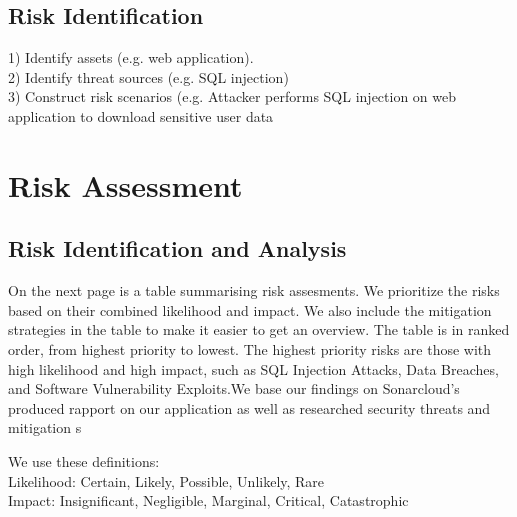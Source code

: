 \documentclass[11pt]{article}
\begin{document}
\subsection{Risk Identification}
1) Identify assets (e.g. web application).\\
2) Identify threat sources (e.g. SQL injection) \\
3) Construct risk scenarios (e.g. Attacker performs SQL injection on web application to download sensitive user data


\section{Risk Assessment}

\subsection{Risk Identification and Analysis}
 On the next page is a table summarising risk assesments. We prioritize the risks based on their combined likelihood and impact. We also include the mitigation strategies in the table to make it easier to get an overview. The table is in ranked order, from highest priority to lowest. The highest priority risks are those with high likelihood and high impact, such as SQL Injection Attacks, Data Breaches, and Software Vulnerability Exploits.We base our findings on Sonarcloud's produced rapport on our application as well as researched security threats and mitigation s
 
We use these definitions: \\

Likelihood: {Certain, Likely, Possible, Unlikely, Rare}\\

Impact: {Insignificant, Negligible, Marginal, Critical, Catastrophic}\\
\end{document}

